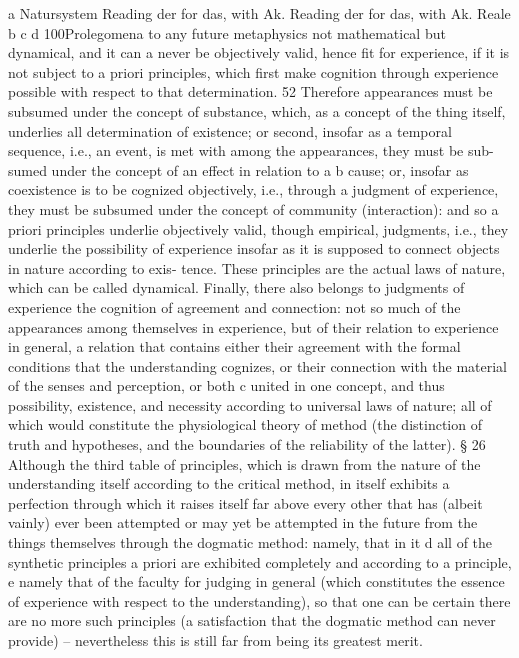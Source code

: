 a Natursystem
Reading der for das, with Ak.
Reading der for das, with Ak.
Reale
b
c
d
100Prolegomena to any future metaphysics
not mathematical but dynamical, and it can a never be objectively valid,
hence ﬁt for experience, if it is not subject to a priori principles, which
ﬁrst make cognition through experience possible with respect to that
determination. 52 Therefore appearances must be subsumed under the
concept of substance, which, as a concept of the thing itself, underlies all
determination of existence; or second, insofar as a temporal sequence,
i.e., an event, is met with among the appearances, they must be sub-
sumed under the concept of an effect in relation to a b cause; or, insofar
as coexistence is to be cognized objectively, i.e., through a judgment of
experience, they must be subsumed under the concept of community
(interaction): and so a priori principles underlie objectively valid, though
empirical, judgments, i.e., they underlie the possibility of experience
insofar as it is supposed to connect objects in nature according to exis-
tence. These principles are the actual laws of nature, which can be called
dynamical.
Finally, there also belongs to judgments of experience the cognition
of agreement and connection: not so much of the appearances among
themselves in experience, but of their relation to experience in general, a
relation that contains either their agreement with the formal conditions
that the understanding cognizes, or their connection with the material
of the senses and perception, or both c united in one concept, and thus
possibility, existence, and necessity according to universal laws of nature;
all of which would constitute the physiological theory of method (the
distinction of truth and hypotheses, and the boundaries of the reliability
of the latter).
§ 26
Although the third table of principles, which is drawn from the nature of
the understanding itself according to the critical method, in itself exhibits
a perfection through which it raises itself far above every other that
has (albeit vainly) ever been attempted or may yet be attempted in the
future from the things themselves through the dogmatic method: namely,
that in it d all of the synthetic principles a priori are exhibited completely
and according to a principle, e namely that of the faculty for judging
in general (which constitutes the essence of experience with respect to
the understanding), so that one can be certain there are no more such
principles (a satisfaction that the dogmatic method can never provide) –
nevertheless this is still far from being its greatest merit.
